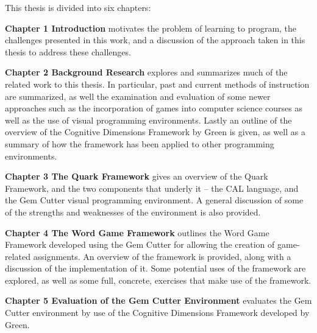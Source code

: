 This thesis is divided into six chapters:  


\textbf{Chapter 1 Introduction} motivates the problem of learning to program, the challenges presented in this work, and a discussion of the approach taken in this thesis to address these challenges.


\textbf{Chapter 2 Background Research} explores and summarizes much of the related work to this thesis.  In particular, past and current methods of instruction are summarized, as well the examination and evaluation of some newer approaches such as the incorporation of games into computer science courses as well as the use of visual programming environments.  Lastly an outline of the overview of the Cognitive Dimensions Framework by Green is given, as well as a summary of how the framework has been applied to other programming environments.

\textbf{Chapter 3 The Quark Framework} gives an overview of the Quark Framework, and the two components that underly it -- the CAL language, and the Gem Cutter visual programming environment.  A general discussion of some of the strengths and weaknesses of the environment is also provided.

	
\textbf{Chapter 4 The Word Game Framework} outlines the Word Game Framework developed using the Gem Cutter for allowing the creation of game-related assignments.  An overview of the framework is provided, along with a discussion of the implementation of it.  Some potential uses of the framework are explored, as well as some full, concrete, exercises that make use of the framework.


\textbf{Chapter 5 Evaluation of the Gem Cutter Environment} evaluates the Gem Cutter environment by use of the Cognitive Dimensions Framework developed by Green.

